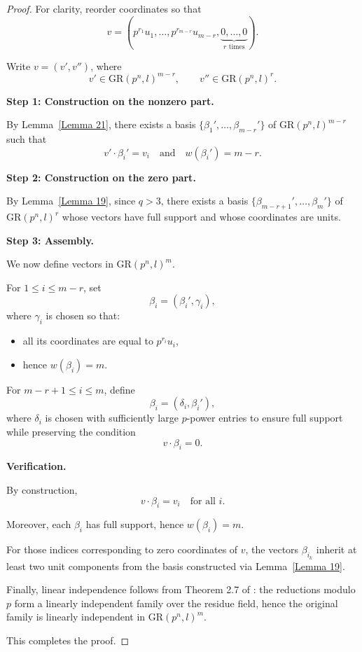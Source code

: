 \documentclass[10pt]{article}
\theoremstyle{definition}
\begin{document}
\begin{proof}
For clarity, reorder coordinates so that
\[
v=
(p^{r_1}u_1,\dots,p^{r_{m-r}}u_{m-r},
\underbrace{0,\dots,0}_{r\text{ times}}).
\]

Write $v=(v',v'')$, where
\[
v'\in \mathrm{GR}(p^n,l)^{m-r},
\qquad
v''\in \mathrm{GR}(p^n,l)^r.
\]

\medskip
\noindent
\textbf{Step 1: Construction on the nonzero part.}

By Lemma~\ref{Lemma 21},
there exists a basis
$\{\beta_1',\dots,\beta_{m-r}'\}$
of $\mathrm{GR}(p^n,l)^{m-r}$ such that
\[
v'\cdot \beta_i'=v_i
\quad\text{and}\quad
w(\beta_i')=m-r.
\]

\medskip
\noindent
\textbf{Step 2: Construction on the zero part.}

By Lemma~\ref{Lemma 19},
since $q>3$,
there exists a basis
$\{\beta_{m-r+1}',\dots,\beta_m'\}$
of $\mathrm{GR}(p^n,l)^r$
whose vectors have full support and whose coordinates are units.

\medskip
\noindent
\textbf{Step 3: Assembly.}

We now define vectors in $\mathrm{GR}(p^n,l)^m$.

For $1\le i\le m-r$, set
\[
\beta_i=(\beta_i',\gamma_i),
\]
where $\gamma_i$ is chosen so that:

\begin{itemize}
\item all its coordinates are equal to $p^{r_i}u_i$,
\item hence $w(\beta_i)=m$.
\end{itemize}

For $m-r+1\le i\le m$, define
\[
\beta_i=(\delta_i,\beta_i'),
\]
where $\delta_i$ is chosen with sufficiently large $p$-power entries
to ensure full support while preserving the condition
\[
v\cdot \beta_i=0.
\]

\medskip
\noindent
\textbf{Verification.}

By construction,
\[
v\cdot \beta_i=v_i
\quad\text{for all } i.
\]

Moreover, each $\beta_i$ has full support,
hence $w(\beta_i)=m$.

For those indices corresponding to zero coordinates of $v$,
the vectors $\beta_{i_k}$ inherit at least two unit components
from the basis constructed via Lemma~\ref{Lemma 19}.

Finally, linear independence follows from Theorem 2.7 of
\cite{NortonSalagean}:
the reductions modulo $p$ form a linearly independent family
over the residue field, hence the original family
is linearly independent in $\mathrm{GR}(p^n,l)^m$.

This completes the proof.
\end{proof}
\end{document}
